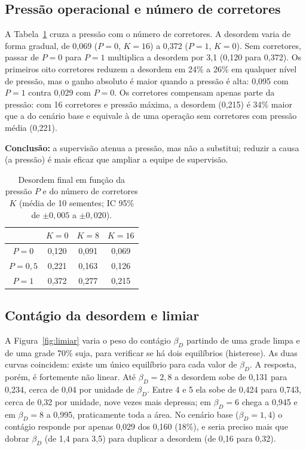 \documentclass[11pt, a4paper]{article}
\begin{document}
\subsection{Pressão operacional e número de corretores}
A Tabela~\ref{tab:PK} cruza a pressão com o número de corretores. A desordem varia de forma gradual, de 0,069 ($P=0$, $K=16$) a 0,372 ($P=1$, $K=0$). Sem corretores, passar de $P=0$ para $P=1$ multiplica a desordem por 3,1 (0,120 para 0,372). Os primeiros oito corretores reduzem a desordem em 24\% a 26\% em qualquer nível de pressão, mas o ganho absoluto é maior quando a pressão é alta: 0,095 com $P=1$ contra 0,029 com $P=0$. Os corretores compensam apenas parte da pressão: com 16 corretores e pressão máxima, a desordem (0,215) é 34\% maior que a do cenário base e equivale à de uma operação sem corretores com pressão média (0,221).

\textbf{Conclusão:} a supervisão atenua a pressão, mas não a substitui; reduzir a causa (a pressão) é mais eficaz que ampliar a equipe de supervisão.

\begin{table}[t]
\centering
\footnotesize
\caption{Desordem final em função da pressão $P$ e do número de corretores $K$ (média de 10 sementes; IC 95\% de $\pm0{,}005$ a $\pm0{,}020$).}
\label{tab:PK}
\begin{tabular}{@{}cccc@{}}
\toprule
 & $K=0$ & $K=8$ & $K=16$ \\
\midrule
$P=0$ & 0,120 & 0,091 & 0,069 \\
$P=0{,}5$ & 0,221 & 0,163 & 0,126 \\
$P=1$ & 0,372 & 0,277 & 0,215 \\
\bottomrule
\end{tabular}
\end{table}

\subsection{Contágio da desordem e limiar}
A Figura~\ref{fig:limiar} varia o peso do contágio $\beta_D$ partindo de uma grade limpa e de uma grade 70\% suja, para verificar se há dois equilíbrios (histerese). As duas curvas coincidem: existe um único equilíbrio para cada valor de $\beta_D$. A resposta, porém, é fortemente não linear. Até $\beta_D=2{,}8$ a desordem sobe de 0,131 para 0,234, cerca de 0,04 por unidade de $\beta_D$. Entre 4 e 5 ela sobe de 0,424 para 0,743, cerca de 0,32 por unidade, nove vezes mais depressa; em $\beta_D=6$ chega a 0,945 e em $\beta_D=8$ a 0,995, praticamente toda a área. No cenário base ($\beta_D=1{,}4$) o contágio responde por apenas 0,029 dos 0,160 (18\%), e seria preciso mais que dobrar $\beta_D$ (de 1,4 para 3,5) para duplicar a desordem (de 0,16 para 0,32).
\end{document}
